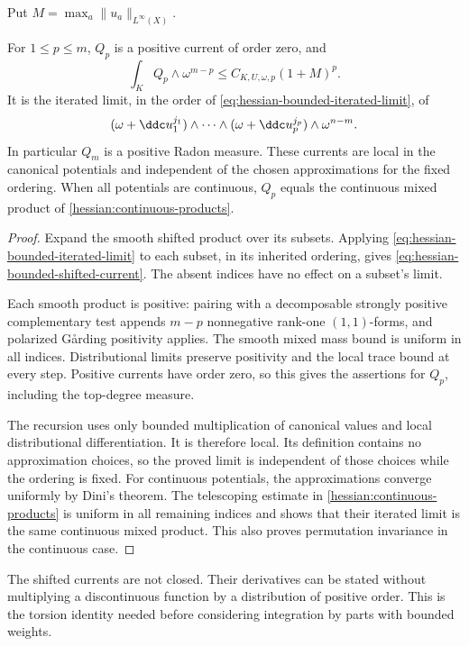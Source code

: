 Put $M=\max_a\|u_a\|_{L^\infty(X)}$.

\begin{theorem}\label{hessian:bounded-shifted-positive}
For $1\leq p\leq m$, $Q_p$ is a positive current of order zero, and
\[
 \int_KQ_p\wedge\omega^{m-p}
       \leq C_{K,U,\omega,p}(1+M)^p.
\]
It is the iterated limit, in the order of
\eqref{eq:hessian-bounded-iterated-limit}, of
\[
 (\omega+\ddc u_1^{j_1})\wedge\cdots\wedge
 (\omega+\ddc u_p^{j_p})\wedge\omega^{n-m}.
\]
In particular $Q_m$ is a positive Radon measure. These currents are
local in the canonical potentials and independent of the chosen
approximations for the fixed ordering. When all potentials are
continuous, $Q_p$ equals the continuous mixed product of
\cref{hessian:continuous-products}.
\end{theorem}
\begin{proof}
Expand the smooth shifted product over its subsets. Applying
\eqref{eq:hessian-bounded-iterated-limit} to each subset, in its
inherited ordering, gives \eqref{eq:hessian-bounded-shifted-current}.
The absent indices have no effect on a subset's limit.

Each smooth product is positive: pairing with a decomposable
strongly positive complementary test appends $m-p$ nonnegative
rank-one $(1,1)$-forms, and polarized G\aa rding positivity applies.
The smooth mixed mass bound is uniform in all indices. Distributional
limits preserve positivity and the local trace bound at every step.
Positive currents have order zero, so this gives the assertions for
$Q_p$, including the top-degree measure.

The recursion uses only bounded multiplication of canonical values
and local distributional differentiation. It is therefore local.
Its definition contains no approximation choices, so the proved
limit is independent of those choices while the ordering is fixed.
For continuous potentials, the approximations converge uniformly by
Dini's theorem. The telescoping estimate in
\cref{hessian:continuous-products} is uniform in all remaining
indices and shows that their iterated limit is the same continuous
mixed product. This also proves permutation invariance in the
continuous case.
\end{proof}

The shifted currents are not closed. Their derivatives can be stated
without multiplying a discontinuous function by a distribution of
positive order. This is the torsion identity needed before considering
integration by parts with bounded weights.

